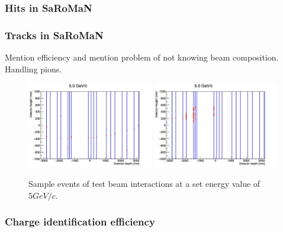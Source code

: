 \subsubsection{Hits in SaRoMaN}

\subsubsection{Tracks in SaRoMaN}

Mention efficiency and mention problem of not knowing beam composition. Handling pions.


\begin{figure}[h!]
\centering
\includegraphics[width=0.49\textwidth]{figures/oldStudies/m5GeVevent2.jpg}
\includegraphics[width=0.49\textwidth]{figures/oldStudies/m5GeVevent3.jpg}
\caption{Sample events of test beam interactions at a set energy value of $5GeV/c$.}
\label{fig:EventsInitial}
\end{figure}

\subsubsection{Charge identification efficiency}


